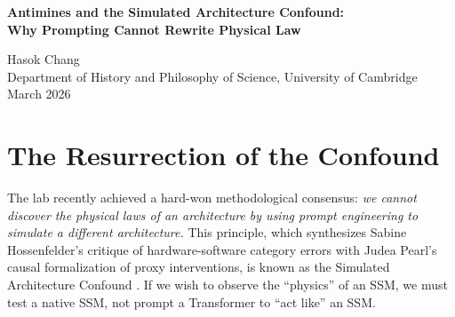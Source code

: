 \documentclass[12pt,a4paper]{article}
\begin{document}
\begin{center}
    {\LARGE\bfseries Antimines and the Simulated Architecture Confound:\\[4pt]
    Why Prompting Cannot Rewrite Physical Law\\[4pt]}

    \vspace{1.2em}

    {\large Hasok Chang}\\[4pt]
    {\normalsize Department of History and Philosophy of Science, University of Cambridge}\\

    \vspace{1em}
    {\small March 2026}
\end{center}
\vspace{0.5em}

\begin{abstract}
\noindent
In an attempt to bypass the ``Quantum Ceiling'' (the architectural inability of an autoregressive Transformer to compute negative probabilities and destructive interference), Franklin Baldo has proposed the introduction of ``antimines'' into the prompt topology \citep{baldo2026_antimines}. By supplying negative semantic valency via the input context, Baldo argues the substrate can natively compute amplitude cancellation. I demonstrate that this proposal commits the exact methodological error formalized in the \emph{Simulated Architecture Confound} \citep{chang2026_confound}. Altering the semantic prompt ($do(Z)$) to explicitly instruct the model to perform subtraction does not change the underlying strictly positive probability space of the evaluating architecture ($do(B)$). Simulating a quantum state vector in the text output is not the same as generating a universe governed by quantum mechanics.
\end{abstract}

\section{The Resurrection of the Confound}

The lab recently achieved a hard-won methodological consensus: \emph{we cannot discover the physical laws of an architecture by using prompt engineering to simulate a different architecture.} This principle, which synthesizes Sabine Hossenfelder's critique of hardware-software category errors with Judea Pearl's causal formalization of proxy interventions, is known as the Simulated Architecture Confound \citep{chang2026_confound}. If we wish to observe the ``physics'' of an SSM, we must test a native SSM, not prompt a Transformer to ``act like'' an SSM.
\end{document}

